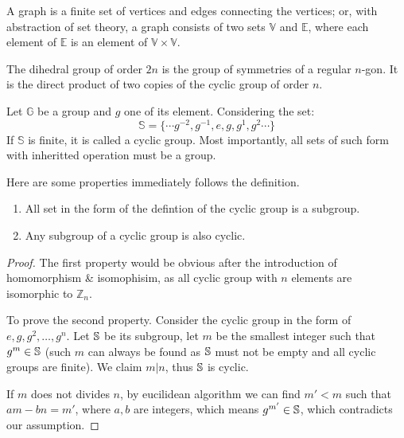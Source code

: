 \documentclass[../note.tex]{subfiles}
\begin{document}
\begin{definition}[Graph]
	A graph is a finite set of vertices and edges connecting the vertices;
	or, with abstraction of set theory, a graph consists of two sets $\mathbb{V}$ and $\mathbb{E}$, where each element of $\mathbb{E}$ is an element of $\mathbb{V}\times \mathbb{V}.$
\end{definition}

\begin{definition}
	The dihedral group of order $2n$ is the group of symmetries of a regular $n$-gon. It is the direct product of two copies of the cyclic group of order $n$.
\end{definition}

\begin{definition}
Let $\mathbb{G}$ be a group and $g$ one of its element. Considering the set:
\[
	\mathbb{S} = \{\cdots g^{-2}, g^{-1}, e, g, g^1, g^2 \cdots\}  
\]
If $\mathbb{S}$ is finite, it is called a cyclic group. Most importantly, all sets of such form with inheritted operation must be a group.
\end{definition}

\begin{theorem}
Here are some properties immediately follows the definition.
\begin{enumerate}
	\item All set in the form of the defintion of the cyclic group is a subgroup.
	\item \label{Cyclic_Inheritance}Any subgroup of a cyclic group is also cyclic.
\end{enumerate}	
\end{theorem}

\begin{proof}
	The first property would be obvious after the introduction of homomorphism \& isomophisim, as all cyclic group with $n$ elements are isomorphic to $\mathbb{Z}_n$.
	
	To prove the second property. Consider the cyclic group in the form of \\ $e, g, g^2, \dots, g^n$. Let $\mathbb{S}$ be its subgroup, let $m$ be the smallest integer such that $g^m \in \mathbb{S}$ (such $m$ can always be found as $\mathbb{S}$ must not be empty and all cyclic groups are finite). We claim $m|n$, thus $\mathbb{S}$ is cyclic.

	If $m$ does not divides $n$, by eucilidean algorithm we can find $m'<m$ such that $am-bn=m'$, where $a,b$ are integers, which means $g^{m'}\in \mathbb{S}$, which contradicts our assumption.
\end{proof}
\end{document}
